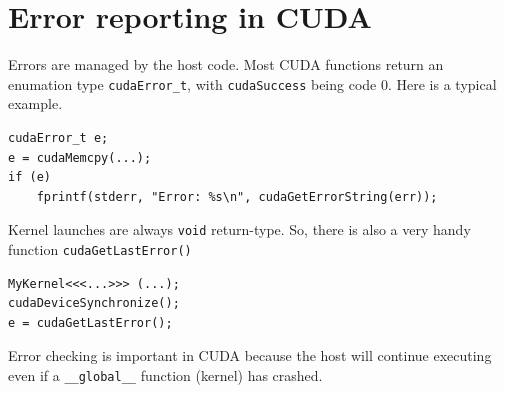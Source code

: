 \section*{Error reporting in CUDA}
Errors are managed by the host code. Most CUDA functions return an
enumation type \texttt{cudaError\_t}, with \texttt{cudaSuccess} being
code 0. Here is a typical example.

\begin{verbatim}
cudaError_t e;
e = cudaMemcpy(...);
if (e)
    fprintf(stderr, "Error: %s\n", cudaGetErrorString(err));
\end{verbatim}

Kernel launches are always \texttt{void} return-type. So, there is
also a very handy function \texttt{cudaGetLastError()}

\begin{verbatim}
MyKernel<<<...>>> (...);
cudaDeviceSynchronize();
e = cudaGetLastError();
\end{verbatim}

Error checking is important in CUDA because the host will continue
executing even if a \texttt{\_\_global\_\_} function (kernel) has
crashed.

